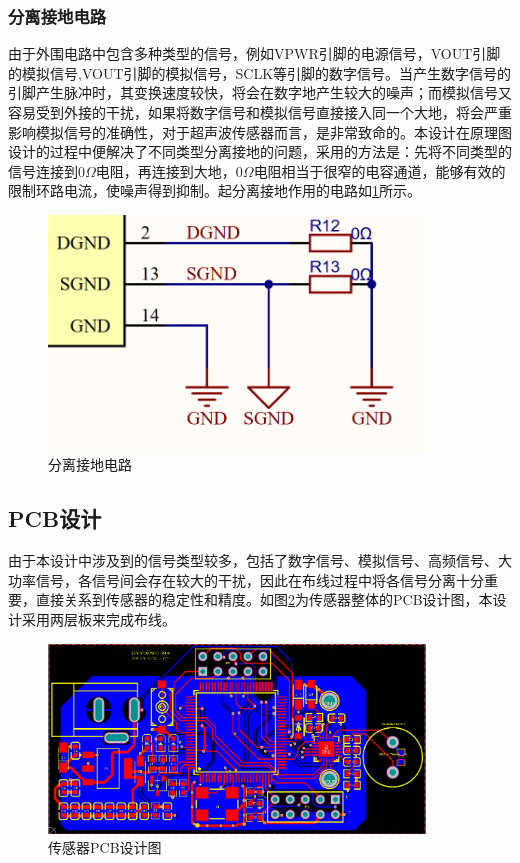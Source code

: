    \subsubsection{分离接地电路}
    由于外围电路中包含多种类型的信号，例如VPWR引脚的电源信号，VOUT引脚的模拟信号,VOUT引脚的模拟信号，SCLK等引脚的数字信号。当产生数字信号的引脚产生脉冲时，其变换速度较快，将会在数字地产生较大的噪声；而模拟信号又容易受到外接的干扰，如果将数字信号和模拟信号直接接入同一个大地，将会严重影响模拟信号的准确性，对于超声波传感器而言，是非常致命的。本设计在原理图设计的过程中便解决了不同类型分离接地的问题，采用的方法是：先将不同类型的信号连接到0$\Omega$电阻，再连接到大地，0$\Omega$电阻相当于很窄的电容通道，能够有效的限制环路电流，使噪声得到抑制。起分离接地作用的电路如\ref{分离接地电路}所示。
     \begin{figure}[ht]
        \centering
        \includegraphics[width=10cm]{figure/seperate ground.png}
        \caption{分离接地电路}
        \label{分离接地电路}
    \end{figure}


    

    
    \subsection{PCB设计}
    由于本设计中涉及到的信号类型较多，包括了数字信号、模拟信号、高频信号、大功率信号，各信号间会存在较大的干扰，因此在布线过程中将各信号分离十分重要，直接关系到传感器的稳定性和精度。如图\ref{传感器PCB设计图}为传感器整体的PCB设计图，本设计采用两层板来完成布线。
      \begin{figure}[ht]
        \centering
        \includegraphics[width=10cm]{figure/overall pcb}
        \caption{传感器PCB设计图}
        \label{传感器PCB设计图}
    \end{figure}
    
